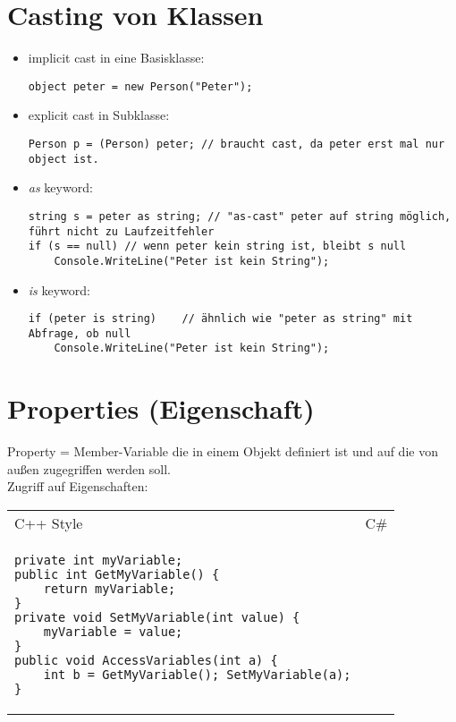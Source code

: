 \section{Casting von Klassen}
\begin{itemize}
\item implicit cast in eine Basisklasse:
\begin{lstlisting}[language={[Sharp]C}]
object peter = new Person("Peter");
\end{lstlisting}
\item explicit cast in Subklasse:
\begin{lstlisting}[language={[Sharp]C}]
Person p = (Person) peter; // braucht cast, da peter erst mal nur object ist.
\end{lstlisting} 
\item \emph{as} keyword: 
\begin{lstlisting}[language={[Sharp]C}]
string s = peter as string;	// "as-cast" peter auf string möglich, führt nicht zu Laufzeitfehler
if (s == null) // wenn peter kein string ist, bleibt s null
	Console.WriteLine("Peter ist kein String");
\end{lstlisting}
\item \emph{is} keyword: 
\begin{lstlisting}[language={[Sharp]C}]
if (peter is string)	// ähnlich wie "peter as string" mit Abfrage, ob null
	Console.WriteLine("Peter ist kein String");
\end{lstlisting}
\end{itemize}
\section{Properties (Eigenschaft)}
Property = Member-Variable die in einem Objekt definiert ist und auf die von außen zugegriffen werden soll.\\
Zugriff auf Eigenschaften: \\
\begin{tabular}{L{.5} L{.5}}
C++ Style &  C\#\\
\begin{lstlisting}[language={[Sharp]C}]
private int myVariable;
public int GetMyVariable() {
	return myVariable;
}
private void SetMyVariable(int value) {
	myVariable = value;
}
public void AccessVariables(int a) {
	int b = GetMyVariable(); SetMyVariable(a);
} 
\end{lstlisting} &
\begin{lstlisting}[language={[Sharp]C}]

\end{lstlisting}\\
\end{tabular}

